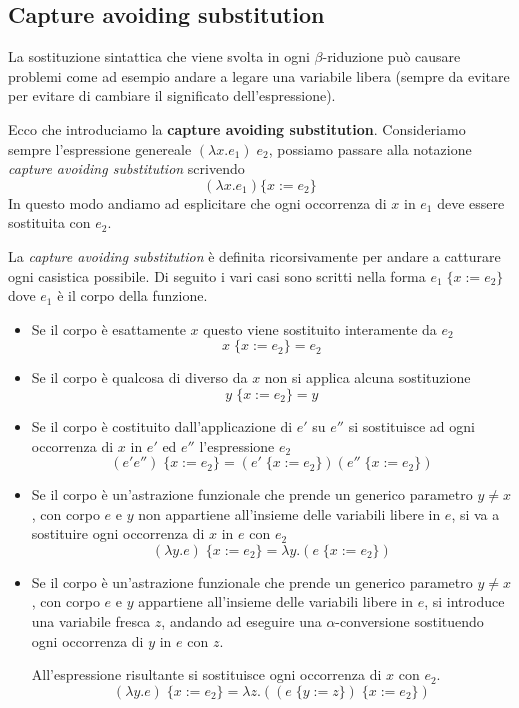 \subsection{Capture avoiding substitution}
La sostituzione sintattica che viene svolta in ogni $\beta$-riduzione può causare problemi come ad esempio andare a
legare una variabile libera (sempre da evitare per evitare di cambiare il significato dell'espressione).

Ecco che introduciamo la \textbf{capture avoiding substitution}. Consideriamo sempre l'espressione genereale
$(\lambda x.e_1) \; e_2$, possiamo passare alla notazione \emph{capture avoiding substitution} scrivendo
\[ (\lambda x.e_1) \{ x := e_2 \} \]
In questo modo andiamo ad esplicitare che ogni occorrenza di $x$ in $e_1$ deve essere sostituita con $e_2$.

La \emph{capture avoiding substitution} è definita ricorsivamente per andare a catturare ogni casistica possibile. Di
seguito i vari casi sono scritti nella forma $e_1 \; \{ x := e_2 \}$ dove $e_1$ è il corpo della funzione.
\begin{itemize}
	\item Se il corpo è esattamente $x$ questo viene sostituito interamente da $e_2$
	      \[ x \; \{ x := e_2 \} = e_2 \]
	\item Se il corpo è qualcosa di diverso da $x$ non si applica alcuna sostituzione
	      \[ y \; \{ x := e_2 \} = y \]
	\item Se il corpo è costituito dall'applicazione di $e'$ su $e''$ si sostituisce ad ogni occorrenza di $x$ in
	      $e'$ ed $e''$ l'espressione $e_2$
	      \[ (e' e'') \; \{ x := e_2 \} = (e' \; \{ x := e_2 \})(e'' \; \{ x := e_2 \}) \]
	\item Se il corpo è un'astrazione funzionale che prende un generico parametro $y \neq x$, con corpo $e$ e $y$ non
	      appartiene all'insieme delle variabili libere in $e$, si va a sostituire ogni occorrenza di $x$ in $e$ con
	      $e_2$
	      \[ (\lambda y.e) \; \{ x := e_2 \} = \lambda y.(e \; \{ x := e_2 \}) \]
	\item Se il corpo è un'astrazione funzionale che prende un generico parametro $y \neq x$, con corpo $e$ e $y$
	      appartiene all'insieme delle variabili libere in $e$, si introduce una variabile fresca $z$, andando ad
	      eseguire una $\alpha$-conversione sostituendo ogni occorrenza di $y$ in $e$ con $z$.

	      All'espressione risultante si sostituisce ogni occorrenza di $x$ con $e_2$.
	      \[ (\lambda y.e) \; \{ x := e_2 \} = \lambda z.((e \; \{ y := z \}) \; \{ x := e_2 \}) \]
\end{itemize}
